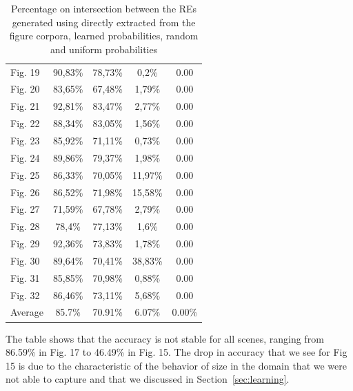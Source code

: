 \begin{table}[h!]
\begin{center}
\begin{tabular}{|l|c|c|c|c|}
Fig. 19	&	90,83\%	&	78,73\%	&	0,2\%	&	0.00\\%
Fig. 20	&	83,65\%	&	67,48\%	&	1,79\%	&	0.00\\%
Fig. 21	&	92,81\%	&	83,47\%	&	2,77\%	&	0.00\\%
Fig. 22	&	88,34\%	&	83,05\%	&	1,56\%	&	0.00\\%
Fig. 23	&	85,92\%	&	71,11\%	&	0,73\%	&	0.00\\%
Fig. 24	&	89,86\%	&	79,37\%	&	1,98\%	&	0.00\\%
Fig. 25	&	86,33\%	&	70,05\%	&	11,97\%	&	0.00\\%
Fig. 26	&	86,52\%	&	71,98\%	&	15,58\%	&	0.00\\%
Fig. 27	&	71,59\%	&	67,78\%	&	2,79\%	&	0.00\\%
Fig. 28	&	78,4\%	&	77,13\%	&	1,6\%	&	0.00\\%
Fig. 29	&	92,36\%	&	73,83\%	&	1,78\%	&	0.00\\%
Fig. 30	&	89,64\%	&	70,41\%	&	38,83\%	&	0.00\\%
Fig. 31	&	85,85\%	&	70,98\%	&	0,88\%	&	0.00\\%
Fig. 32	&	86,46\%	&	73,11\%	&	5,68\%	&	0.00\\%
\hline
Average	&	85.7\%	&	70.91\%	&	6.07\%	&	0.00\%	\\

\hline
\end{tabular}
\caption{Percentage on intersection between the REs generated using directly extracted from the figure corpora\label{results-algo-all}, learned probabilities, random and uniform probabilities}
\end{center}
\end{table}

The table shows that the accuracy is not stable for all scenes, ranging from 86.59\% in Fig. 17 to 46.49\% in Fig. 15. The drop in accuracy that we see for Fig 15 is due to the characteristic of the behavior of size in the domain that we were not able to capture and that we discussed in Section~\ref{sec:learning}. 

